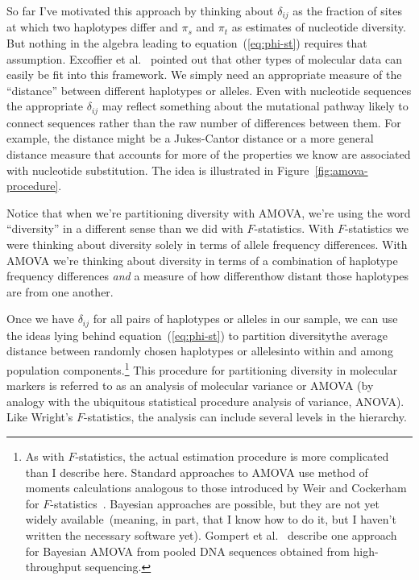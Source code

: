 \documentclass[12pt]{article}
\begin{document}
So far I've motivated this approach by thinking about $\delta_{ij}$ as
the fraction of sites at which two haplotypes differ and $\pi_s$ and
$\pi_t$ as estimates of nucleotide diversity. But nothing in the
algebra leading to equation~(\ref{eq:phi-st}) requires that
assumption. Excoffier et al.~\cite{Excoffier-etal92} pointed out that
other types of molecular data can easily be fit into this
framework. We simply need an appropriate measure of the ``distance''
between different haplotypes or alleles. Even with nucleotide
sequences the appropriate $\delta_{ij}$ may reflect something about
the mutational pathway likely to connect sequences rather than the raw
number of differences between them. For example, the distance might be
a Jukes-Cantor distance or a more general distance measure that
accounts for more of the properties we know are associated with
nucleotide substitution. The idea is illustrated in
Figure~\ref{fig:amova-procedure}.

Notice that when we're partitioning diversity with AMOVA, we're using
the word ``diversity'' in a different sense than we did with
$F$-statistics. With $F$-statistics we were thinking about diversity
solely in terms of allele frequency differences. With AMOVA we're
thinking about diversity in terms of a combination of haplotype
frequency differences {\it and\/} a measure of how different{\dash}how
distant{\dash} those haplotypes are from one another. 

Once we have $\delta_{ij}$ for all pairs of haplotypes or alleles in
our sample, we can use the ideas lying behind
equation~(\ref{eq:phi-st}) to partition diversity{\dash}the average
distance between randomly chosen haplotypes or alleles{\dash}into
within and among population components.\footnote{As with
  $F$-statistics, the actual estimation procedure is more complicated
  than I describe here. Standard approaches to AMOVA use method of
  moments calculations analogous to those introduced by Weir and
  Cockerham for $F$-statistics~\cite{WeirCockerham84}. Bayesian
  approaches are possible, but they are not yet widely
  available~(meaning, in part, that I know how to do it, but I haven't
  written the necessary software yet). Gompert et
  al.~\cite{Gompert-etal-2010} describe one approach for Bayesian
  AMOVA from pooled DNA sequences obtained from high-throughput
  sequencing.} This procedure for partitioning diversity in molecular
markers is referred to as an analysis of molecular variance or AMOVA
(by analogy with the ubiquitous statistical procedure analysis of
variance, ANOVA). Like Wright's $F$-statistics, the analysis can
include several levels in the hierarchy.
\end{document}
